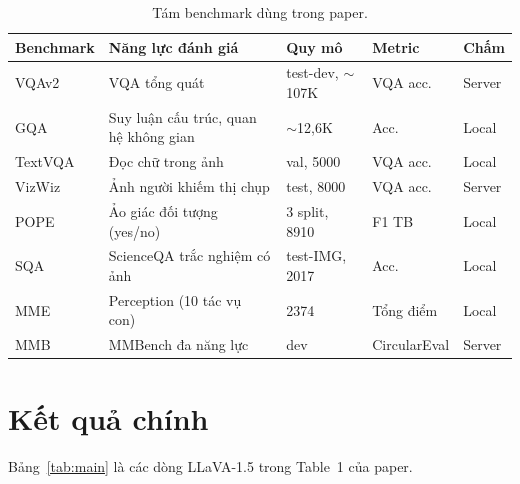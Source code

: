 \documentclass[11pt,a4paper]{article}
\begin{document}
\begin{table}[H]
\centering
\caption{Tám benchmark dùng trong paper.}
\label{tab:bench}
\small
\begin{tabularx}{\linewidth}{@{}lXlll@{}}
\toprule
Benchmark & Năng lực đánh giá & Quy mô & Metric & Chấm \\
\midrule
VQAv2 & VQA tổng quát & test-dev, $\sim$107K & VQA acc. & Server \\
GQA & Suy luận cấu trúc, quan hệ không gian & $\sim$12,6K & Acc. & Local \\
TextVQA & Đọc chữ trong ảnh & val, 5000 & VQA acc. & Local \\
VizWiz & Ảnh người khiếm thị chụp & test, 8000 & VQA acc. & Server \\
POPE & Ảo giác đối tượng (yes/no) & 3 split, 8910 & F1 TB & Local \\
SQA & ScienceQA trắc nghiệm có ảnh & test-IMG, 2017 & Acc. & Local \\
MME & Perception (10 tác vụ con) & 2374 & Tổng điểm & Local \\
MMB & MMBench đa năng lực & dev & CircularEval & Server \\
\bottomrule
\end{tabularx}
\end{table}

\section{Kết quả chính}

Bảng~\ref{tab:main} là các dòng LLaVA-1.5 trong Table~1 của paper.
\end{document}
